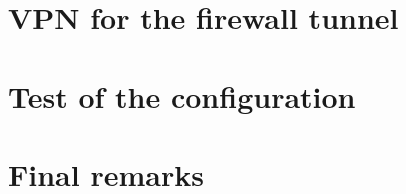 \documentclass{homework}
\begin{document}
    
    \section{VPN for the firewall tunnel}
    
    \section{Test of the configuration}
    
    \section{Final remarks}
\end{document}
